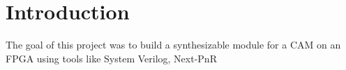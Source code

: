 \section{Introduction}
The goal of this project was to build a synthesizable module for a CAM on an FPGA using tools like System Verilog, Next-PnR